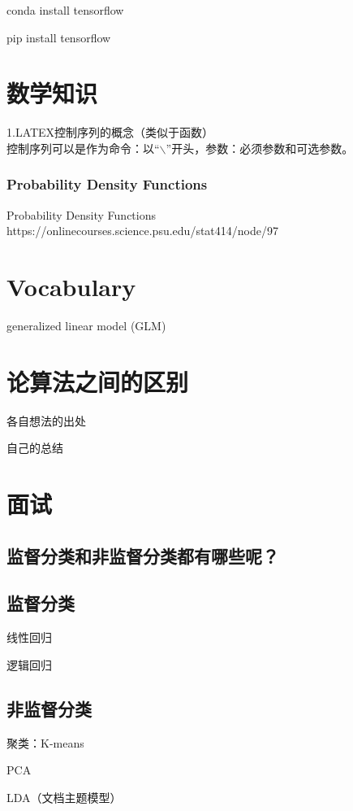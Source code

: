 \documentclass[UTF8]{ctexart}
\begin{document}
        conda install tensorflow

        pip install tensorflow

\section{数学知识}
    1.LATEX控制序列的概念（类似于函数） \\ 控制序列可以是作为命令：以“$\backslash$”开头，参数：必须参数和可选参数。
\subsubsection{Probability Density Functions}

Probability Density Functions https://onlinecourses.science.psu.edu/stat414/node/97

\section{Vocabulary}

generalized linear model (GLM)

\section{论算法之间的区别}

各自想法的出处

自己的总结

\section{面试}

\subsection{监督分类和非监督分类都有哪些呢？}

\subsection{监督分类}

线性回归

逻辑回归


\subsection{非监督分类}

聚类：K-means

PCA

LDA（文档主题模型）
\end{document}
